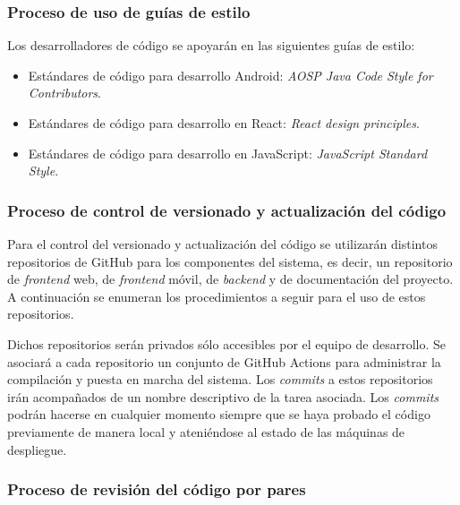 \documentclass{article}
\begin{document}

\subsubsection{Proceso de uso de guías de estilo} \label{P.EC.10}

Los desarrolladores de código se apoyarán en las siguientes guías de estilo:

\begin{itemize}
   \setlength{\itemsep}{0em}
   \item Estándares de código para desarrollo Android: \textit{AOSP Java Code Style for Contributors}.
   \item Estándares de código para desarrollo en React: \textit{React design principles}.
   \item Estándares de código para desarrollo en JavaScript: \textit{JavaScript Standard Style}.
\end{itemize}

\subsubsection{Proceso de control de versionado y actualización del código} \label{P.EC.11}

Para el control del versionado y actualización del código se utilizarán distintos repositorios de GitHub para los componentes del sistema, es decir, un repositorio de \textit{frontend} web, de \textit{frontend} móvil, de \textit{backend} y de documentación del proyecto. A continuación se enumeran los procedimientos a seguir para el uso de estos repositorios.

Dichos repositorios serán privados sólo accesibles por el equipo de desarrollo. 
Se asociará a cada repositorio un conjunto de GitHub Actions para administrar la compilación y puesta en marcha del sistema. 
Los \textit{commits} a estos repositorios irán acompañados de un nombre descriptivo de la tarea asociada. 
Los \textit{commits} podrán hacerse en cualquier momento siempre que se haya probado el código previamente de manera local y ateniéndose al estado de las máquinas de despliegue. 

\subsubsection{Proceso de revisión del código por pares} \label{P.EC.12}
\end{document}
